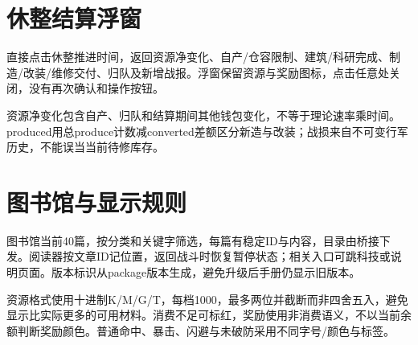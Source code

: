 \section{休整结算浮窗}
直接点击休整推进时间，返回资源净变化、自产/仓容限制、建筑/科研完成、制造/改装/维修交付、归队及新增战报。浮窗保留资源与奖励图标，点击任意处关闭，没有再次确认和操作按钮。

资源净变化包含自产、归队和结算期间其他钱包变化，不等于理论速率乘时间。produced用总produce计数减converted差额区分新造与改装；战损来自不可变行军历史，不能误当当前待修库存。

\section{图书馆与显示规则}
图书馆当前40篇，按分类和关键字筛选，每篇有稳定ID与内容，目录由桥接下发。阅读器按文章ID记位置，返回战斗时恢复暂停状态；相关入口可跳科技或说明页面。版本标识从package版本生成，避免升级后手册仍显示旧版本。

资源格式使用十进制K/M/G/T，每档1000，最多两位并截断而非四舍五入，避免显示比实际更多的可用材料。消费不足可标红，奖励使用非消费语义，不以当前余额判断奖励颜色。普通命中、暴击、闪避与未破防采用不同字号/颜色与标签。
